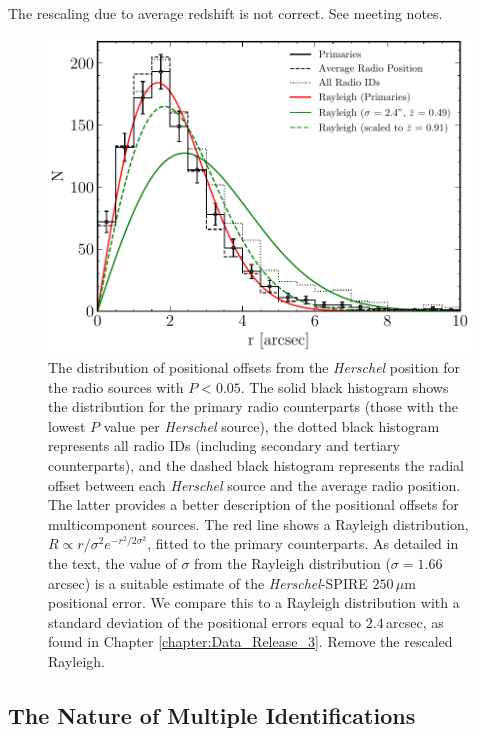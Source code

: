 {\color{red}The rescaling due to average redshift is not correct. See meeting notes.}

\begin{figure}
	\centering
	\includegraphics[width=0.75\columnwidth]{Figures/source_counterpart_offsets.pdf}
	\caption{The distribution of positional offsets from the \textit{Herschel} position for the radio sources with $P < 0.05$. The solid black histogram shows the distribution for the primary radio counterparts (those with the lowest $P$ value per \textit{Herschel} source), the dotted black histogram represents all radio IDs (including secondary and tertiary counterparts), and the dashed black histogram represents the radial offset between each \textit{Herschel} source and the average radio position. The latter provides a better description of the positional offsets for multicomponent sources. The red line shows a Rayleigh distribution, $R \propto r/\sigma^2 e^{-r^2/2\sigma^2}$, fitted to the primary counterparts. As detailed in the text, the value of $\sigma$ from the Rayleigh distribution ($\sigma = 1.66\,$arcsec) is a suitable estimate of the \textit{Herschel}-SPIRE $250\,\mu$m positional error. We compare this to a Rayleigh distribution with a standard deviation of the positional errors equal to $2.4\,$arcsec, as found in Chapter \ref{chapter:Data_Release_3}. {\color{red}Remove the rescaled Rayleigh}.}
	\label{fig:source_counterpart_offset}
\end{figure}

\subsection{The Nature of Multiple Identifications}
\label{sec:multiple_systems}

